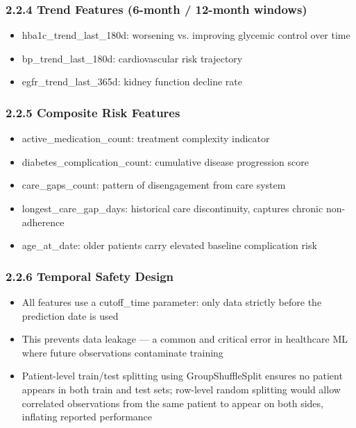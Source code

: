 \documentclass[11pt,a4paper]{article}
\begin{document}
\subsubsection{2.2.4 Trend Features (6-month / 12-month windows)}
\begin{itemize}
\item hba1c\_trend\_last\_180d: worsening vs. improving glycemic control over time
\item bp\_trend\_last\_180d: cardiovascular risk trajectory
\item egfr\_trend\_last\_365d: kidney function decline rate
\end{itemize}

\subsubsection{2.2.5 Composite Risk Features}
\begin{itemize}
\item active\_medication\_count: treatment complexity indicator
\item diabetes\_complication\_count: cumulative disease progression score
\item care\_gaps\_count: pattern of disengagement from care system
\item longest\_care\_gap\_days: historical care discontinuity, captures chronic non-adherence
\item age\_at\_date: older patients carry elevated baseline complication risk
\end{itemize}

\subsubsection{2.2.6 Temporal Safety Design}
\begin{itemize}
\item All features use a cutoff\_time parameter: only data strictly before the prediction date is used
\item This prevents data leakage --- a common and critical error in healthcare ML where future observations contaminate training
\item Patient-level train/test splitting using GroupShuffleSplit ensures no patient appears in both train and test sets; row-level random splitting would allow correlated observations from the same patient to appear on both sides, inflating reported performance
\end{itemize}
\end{document}
